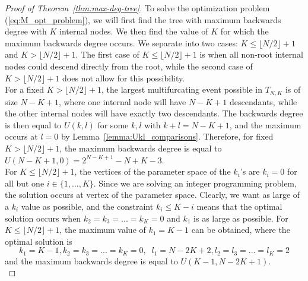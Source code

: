 \documentclass{article}
\begin{document}
\begin{proof}[Proof of Theorem~\ref{thm:max-deg-tree}]
To solve the optimization problem (\ref{eq:M_opt_problem}), we will first find the tree with maximum backwards degree with $K$ internal nodes. We then find the value of $K$ for which the maximum backwards degree occurs. We separate into two cases: $K \leq \lfloor N/2 \rfloor +1$ and $K> \lfloor N/2 \rfloor +1$. The first case of $K \leq \lfloor N/2 \rfloor +1$ is when all non-root internal nodes could descend directly from the root, while the second case of $K> \lfloor N/2 \rfloor +1$ does not allow for this possibility. \\

\noindent For a fixed $K> \lfloor N/2 \rfloor +1$, the largest multifurcating event possible in $T_{N,K}$ is of size $N-K+1$, where one internal node will have $N-K+1$ descendants, while the other internal nodes will have exactly two descendants. The backwards degree is then equal to $U(k,l)$ for some $k,l$ with $k+l=N-K+1$, and the maximum occurs at $l=0$ by Lemma~\ref{lemma:Ukl_comparisons}. Therefore, for fixed $K> \lfloor N/2 \rfloor +1$, the maximum backwards degree is equal to $U(N-K+1, 0) = 2^{N-K+1}-N+K-3$. \\ 

\noindent For $K\leq \lfloor N/2 \rfloor +1$, the vertices of the parameter space of the $k_i$'s are $k_i=0$ for all but one $i\in \{1,...,K\}$. Since we are solving an integer programming problem, the solution occurs at vertex of the parameter space. Clearly, we want as large of a $k_i$ value as possible, and the constraint $k_i \leq K-i$ means that the optimal solution occurs when $k_2=k_3=...=k_K=0$ and $k_1$ is as large as possible. For $K \leq \lfloor N/2 \rfloor +1$, the maximum value of $k_1 = K-1$ can be obtained, where the optimal solution is \[  k_1=K-1, k_2=k_3=...=k_K=0, \;\; l_1= N-2K+2, l_2=l_3=...=l_K=2\] and the maximum backwards degree is equal to $U(K-1, N-2K+1)$. \\


\end{proof}
\end{document}
